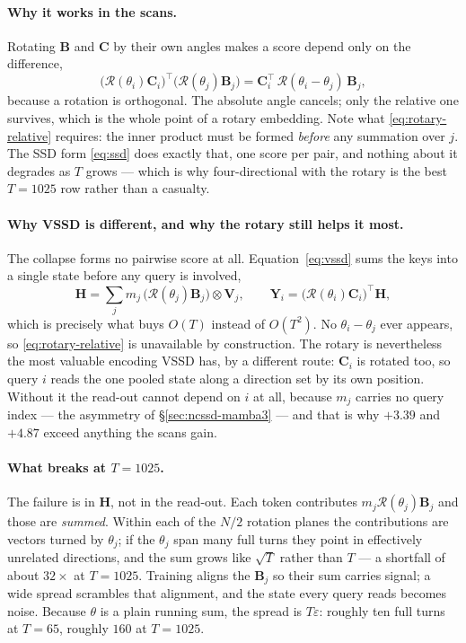 \documentclass[11pt,a4paper]{article}
\begin{document}
\paragraph{Why it works in the scans.}
Rotating $\bm{B}$ and $\bm{C}$ by their own angles makes a score depend only on the
difference,
\begin{equation}
  \bigl(\mathcal{R}(\theta_i)\bm{C}_i\bigr)^{\!\top}\bigl(\mathcal{R}(\theta_j)\bm{B}_j\bigr)
  = \bm{C}_i^{\top}\,\mathcal{R}(\theta_i-\theta_j)\,\bm{B}_j ,
  \label{eq:rotary-relative}
\end{equation}
because a rotation is orthogonal. The absolute angle cancels; only the relative one
survives, which is the whole point of a rotary embedding. Note what
\eqref{eq:rotary-relative} requires: the inner product must be formed \emph{before}
any summation over $j$. The SSD form \eqref{eq:ssd} does exactly that, one score per
pair, and nothing about it degrades as $T$ grows --- which is why four-directional
with the rotary is the best $T{=}1025$ row rather than a casualty.

\paragraph{Why VSSD is different, and why the rotary still helps it most.}
The collapse forms no pairwise score at all. Equation~\eqref{eq:vssd} sums the keys
into a single state before any query is involved,
\begin{equation}
  \bm{H}=\sum_j m_j\,\bigl(\mathcal{R}(\theta_j)\bm{B}_j\bigr)\otimes\bm{V}_j ,
  \qquad
  \bm{Y}_i=\bigl(\mathcal{R}(\theta_i)\bm{C}_i\bigr)^{\!\top}\bm{H},
  \label{eq:vssd-rotary}
\end{equation}
which is precisely what buys $O(T)$ instead of $O(T^2)$. No $\theta_i-\theta_j$ ever
appears, so \eqref{eq:rotary-relative} is unavailable by construction. The rotary is
nevertheless the most valuable encoding VSSD has, by a different route: $\bm{C}_i$ is
rotated too, so query $i$ reads the one pooled state along a direction set by its own
position. Without it the read-out cannot depend on $i$ at all, because $m_j$ carries
no query index --- the asymmetry of \S\ref{sec:ncssd-mamba3} --- and that is why
$+3.39$ and $+4.87$ exceed anything the scans gain.

\paragraph{What breaks at $T{=}1025$.}
The failure is in $\bm{H}$, not in the read-out. Each token contributes
$m_j\mathcal{R}(\theta_j)\bm{B}_j$ and those are \emph{summed}. Within each of the
$N/2$ rotation planes the contributions are vectors turned by $\theta_j$; if the
$\theta_j$ span many full turns they point in effectively unrelated directions, and
the sum grows like $\sqrt{T}$ rather than $T$ --- a shortfall of about $32\times$ at
$T{=}1025$. Training aligns the $\bm{B}_j$ so their sum carries signal; a wide spread
scrambles that alignment, and the state every query reads becomes noise. Because
$\theta$ is a plain running sum, the spread is $T\varepsilon$: roughly ten full turns
at $T{=}65$, roughly $160$ at $T{=}1025$.
\end{document}
